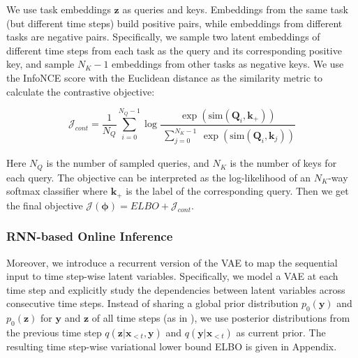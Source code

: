 \documentclass[letterpaper]{article} %
\begin{document}
We use task embeddings $\bm z$ as queries and keys. Embeddings from the same task (but different time steps) build positive pairs, while embeddings from different tasks are negative pairs. Specifically, we sample two latent embeddings of different time steps from each task as the query and its corresponding positive key, and sample $N_{K}-1$ embeddings from other tasks as negative keys. We use the InfoNCE score \cite{InfoNCE} with the 
Euclidean distance as the similarity metric to calculate the contrastive objective:

\begin{equation}
\label{con:infoNCE}
\mathcal{J}_{cont} = \frac{1}{N_Q}\sum_{i=0}^{N_Q-1}\log \frac{\exp(\text{sim}(\bm Q_{i}, \bm k_{+}))}{\begin{matrix} \sum_{j=0}^
{N_{K}-1}\end{matrix} \exp(\text{sim}(\bm Q_{i}, \bm k_{j}))}
\end{equation}

Here $N_Q$ is the number of sampled queries, and $N_{K}$ is the number of keys for each query. The objective can be interpreted as the log-likelihood of an $N_{K}$-way softmax classifier where $\bm k_{+}$ is the label of the corresponding query. Then we get the final objective $\mathcal{J}(\bm \phi) = {ELBO} + \mathcal{J}_{cont}$.


\subsubsection{RNN-based Online Inference}
Moreover, we introduce a recurrent version of the VAE \cite{VRNN} to map the sequential input to time step-wise latent variables. Specifically, we model a VAE at each time step and explicitly study the dependencies between latent variables across consecutive time steps. Instead of sharing a global prior distribution $p_{0}(\bm y) $ and $p_{0}(\bm z) $ for $\bm y$ and $\bm z$ of all time steps (as in \cite{PEARL}), we use posterior distributions from the previous time step $q(\bm z|\bm x_{<t}, \bm y)$ and $q(\bm y|\bm x_{<t})$ as current prior. The resulting time step-wise variational lower bound ELBO is given in Appendix.
%
\end{document}
